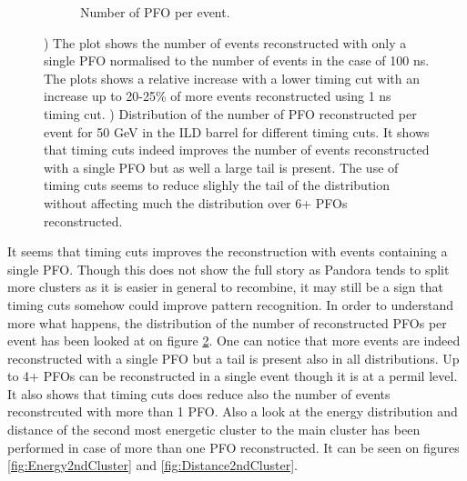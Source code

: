\begin{figure}[htbp!]
\begin{subfigure}[t]{0.49\textwidth}
    \caption{Number of PFO per event.} \label{fig:DistriPFO}
  \end{subfigure}
  \caption{) The plot shows the number of events reconstructed with only a single PFO normalised to the number of events in the case of 100 ns. The plots shows a relative increase with a lower timing cut with an increase up to 20-25\% of more events reconstructed using 1 ns timing cut. ) Distribution of the number of PFO reconstructed per event for 50 GeV \kzeroL{} in the ILD barrel for different timing cuts. It shows that timing cuts indeed improves the number of events reconstructed with a single PFO but as well a large tail is present. The use of timing cuts seems to reduce slighly the tail of the distribution without affecting much the distribution over 6+ PFOs reconstructed.}
\end{figure}

It seems that timing cuts improves the reconstruction with events containing a single PFO. Though this does not show the full story as Pandora tends to split more clusters as it is easier in general to recombine, it may still be a sign that timing cuts somehow could improve pattern recognition. In order to understand more what happens, the distribution of the number of reconstructed PFOs per event has been looked at on figure \ref{fig:DistriPFO}. One can notice that more events are indeed reconstructed with a single PFO but a tail is present also in all distributions. Up to 4+ PFOs can be reconstructed in a single event though it is at a permil level. It also shows that timing cuts does reduce also the number of events reconstrcuted with more than 1 PFO. Also a look at the energy distribution and distance of the second most energetic cluster to the main cluster has been performed in case of more than one PFO reconstructed. It can be seen on figures \ref{fig:Energy2ndCluster} and \ref{fig:Distance2ndCluster}.

